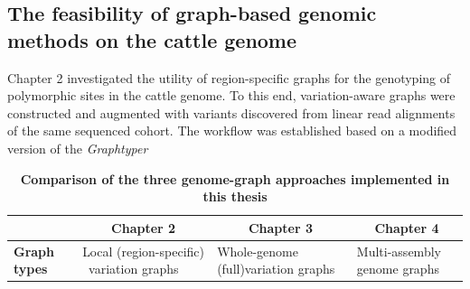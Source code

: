 \documentclass[../main.tex]{subfiles}
\begin{document}
\subsection*{The feasibility of graph-based genomic methods on the cattle genome}


Chapter 2 investigated the utility of region-specific graphs for the genotyping of polymorphic sites in the cattle genome. To this end, variation-aware graphs were constructed and augmented with variants discovered from linear read alignments of the same sequenced cohort. The workflow was established based on a modified version of the \emph{Graphtyper} 


\begin{landscape}
   \thispagestyle{noheadi}
   \begin{table}
      \centering
      \footnotesize
      \caption[Comparison of the genome graph implementations]{\textbf{Comparison of the three genome-graph approaches implemented in this thesis}}
      \begin{tabular}{|l|l|l|l|} 
      \cline{2-4}
      \multicolumn{1}{l|}{~}                                                                              & \multicolumn{1}{c|}{\textbf{Chapter 2}}                                                                                                                                                                                                                                 & \multicolumn{1}{c|}{\textbf{Chapter 3}}                                                                                                                                                                                   & \multicolumn{1}{c|}{\textbf{Chapter 4}}                                                                                                                                                                                                                            \\ 
      \hline
      \textbf{Graph types}                                                                                     & Local (region-specific) ~variation graphs                                                                                                                                                                                                                               & Whole-genome (full)variation graphs                                                                                                                                                                                       & Multi-assembly genome graphs                                                                                                                                                                                                                                       \\ 

\end{tabular}
\end{table}
\end{landscape}
\end{document}
